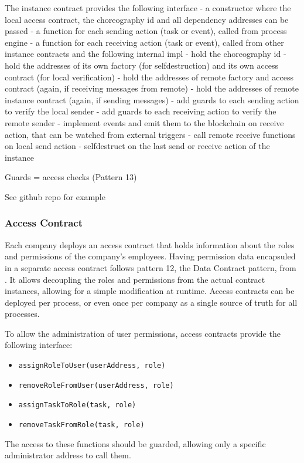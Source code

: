 \documentclass[runningheads]{llncs}
\begin{document}
The instance contract provides the following interface
- a constructor where the local access contract, the choreography id and all dependency addresses can be passed
- a function for each sending action (task or event), called from process engine
- a function for each receiving action (task or event), called from other instance contracts
and the following internal impl
- hold the choreography id
- hold the addresses of its own factory (for selfdestruction) and its own access contract (for local verification)
- hold the addresses of remote factory and access contract (again, if receiving messages from remote)
- hold the addresses of remote instance contract (again, if sending messages)
- add guards to each sending action to verify the local sender
- add guards to each receiving action to verify the remote sender
- implement events and emit them to the blockchain on receive action, that can be watched from external triggers
- call remote receive functions on local send action
- selfdestruct on the last send or receive action of the instance

Guards = access checks (Pattern 13)

See github repo for example %

\subsubsection{Access Contract}

Each company deploys an access contract that holds information about the roles and permissions of the company's employees.
Having permission data encapsuled in a separate access contract follows pattern 12, the Data Contract pattern, from \cite{xu2018pattern}.
It allows decoupling the roles and permissions from the actual contract instances, allowing for a simple modification at runtime.
Access contracts can be deployed per process, or even once per company as a single source of truth for all processes.

To allow the administration of user permissions, access contracts provide the following interface:
\begin{itemize}
	\item
	      \texttt{assignRoleToUser(userAddress, role)}
	\item
	      \texttt{removeRoleFromUser(userAddress, role)}
	\item
	      \texttt{assignTaskToRole(task, role)}
	\item
	      \texttt{removeTaskFromRole(task, role)}
\end{itemize}
The access to these functions should be guarded, allowing only a specific administrator address to call them.
\end{document}
